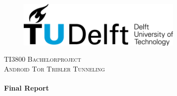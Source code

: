 \begin{titlepage}

\begin{center}




\begin{figure}[ht!]
\centering
\includegraphics[width=80mm]{graphics/TUDLogo.png}
\vspace{15mm}
\end{figure}

\textsc{\large TI3800 Bachelorproject}\\[0.5cm]
\textsc{\normalsize Android Tor Tribler Tunneling}\\[0.5cm]


\HRule \\[0.4cm]
{ \huge \bfseries Final Report}\\[0.4cm]

\HRule \\[1.5cm]


\end{center}
\end{titlepage}
